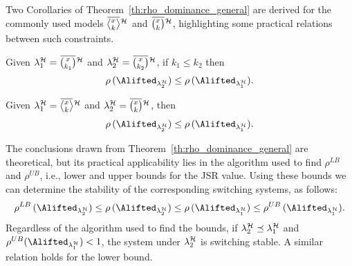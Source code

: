 Two Corollaries of Theorem~\ref{th:rho_dominance_general} are derived for the commonly used models $\erowmiss{}{\strat}$ and $\eanymiss{}{\strat}$, highlighting some practical relations between such constraints.
\begin{corollary}%
    \label{cor:rho_dominance_mk}%
    Given $\lambda^\strat_1 = \overbar{\binom{x}{k_1}}^{\strat}$ and $\lambda^\strat_2 = \overbar{\binom{x}{k_2}}^{\strat}$, if $k_1 \leq k_2$ then
    $$
        \rho\,(\Alifted_{\lambda^\strat_2}) \leq \rho\,(\Alifted_{\lambda^\strat_1}).
    $$
\end{corollary}
\begin{corollary}%
    \label{cor:rho_dominance_cons}%
    Given $\lambda^\strat_1 = \erowmiss{}{\strat}$ and $\lambda^\strat_2 = \eanymiss{}{\strat}$, then
    $$
        \rho\,(\Alifted_{\lambda^\strat_2}) \leq \rho\,(\Alifted_{\lambda^\strat_1}).
    $$
\end{corollary}
%
The conclusions drawn from Theorem~\ref{th:rho_dominance_general} are theoretical, but its practical applicability lies in the algorithm used to find $\rho^{LB}$ and $\rho^{UB}$, i.e., lower and upper bounds for the JSR value.
Using these bounds we can determine the stability of the corresponding switching systems, as follows:
%
$$
\rho^{LB} \,( \Alifted_{\lambda^\strat_2} ) \leq \rho \,( \Alifted_{\lambda^\strat_2} ) \leq \rho \,( \Alifted_{\lambda^\strat_1} ) \leq \rho^{UB} \,( \Alifted_{\lambda^\strat_1} ).
$$
%
Regardless of the algorithm used to find the bounds, if $\lambda^{\mathcal{H}}_2 \preceq \lambda^{\mathcal{H}}_1$ and $\rho^{UB} ( \Alifted_{\lambda^\strat_1} ) < 1$, the system under $\lambda^{\mathcal{H}}_2$ is switching stable.
A similar relation holds for the lower bound.

